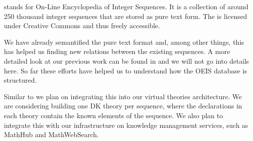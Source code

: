 \OEIS \cite{oeis} stands for On-Line Encyclopedia of Integer Sequences. It is a collection
of around 250 thousand integer sequences that are stored as pure text form. The \OEIS is
licensed under Creative Commons and thus freely accessible.

We have already semantified the pure text format and, among other things, this has helped
us finding new relations between the existing sequences. A more detailed look at our
previous work can be found in \cite{LuzKoh:fsarfo16} and we will not go into details
here. So far these efforts have helped us to understand how the OEIS database is
structured.

Similar to \LMFDB we plan on integrating this into our virtual theories architecture. We
are considering building one DK theory per sequence, where the declarations in each theory
contain the known elements of the sequence. We also plan to integrate this with our
infrastructure on knowledge management services, such as MathHub and MathWebSearch.



